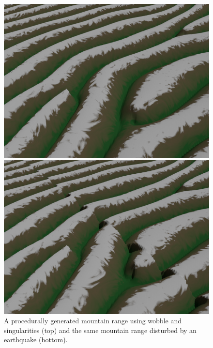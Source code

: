 \documentclass{utue} %
\begin{document}
\begin{figure}[ht]
  \centering
  \includegraphics[width=\linewidth]{images/mountains}

  \vspace{2pt}
  
  \includegraphics[width=\linewidth]{images/mountainsRip}
  \caption{A procedurally generated mountain range using wobble and singularities (top) and the same mountain range disturbed by an earthquake (bottom).}\label{fig:mountains}
\end{figure}
\end{document}
